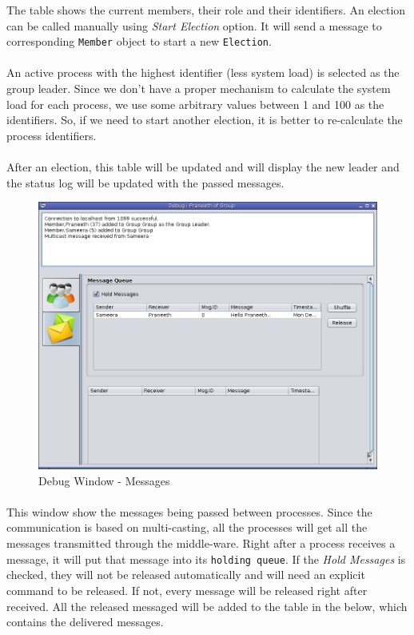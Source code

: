 \documentclass[a4paper,english,twoside]{article}
\begin{document}
The table shows the current members, their role and their identifiers. An election can be called manually using \textit{Start Election} option. It will send a message to corresponding \texttt{Member} object to start a new \texttt{Election}.

\paragraph{}
An active process with the highest identifier (less system load) is selected as the group leader. Since we don't have a proper mechanism to calculate the system load for each process, we use some arbitrary values between 1 and 100 as the identifiers. So, if we need to start another election, it is better to re-calculate the process identifiers.

\paragraph{}
After an election, this table will be updated and will display the new leader and the status log will be updated with the passed messages.


\begin{figure}[h]
\begin{center}
\includegraphics[width=450px]{DebugWindow-2.png}
\caption{Debug Window - Messages}
\end{center}
\end{figure}

\paragraph{}
This window show the messages being passed between processes. Since the communication is based on multi-casting, all the processes will get all the messages transmitted through the middle-ware. Right after a process receives a message, it will put that message into its \texttt{holding queue}. If the \textit{Hold Messages} is checked, they will not be released automatically and will need an explicit command to be released. If not, every message will be released right after received. All the released messaged will be added to the table in the below, which contains the delivered messages.
\end{document}

